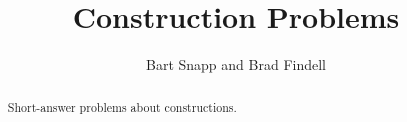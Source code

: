 \documentclass[nooutcomes]{ximera}
\title{Construction Problems}
\author{Bart Snapp and Brad Findell}
\begin{document}
\begin{abstract}
Short-answer problems about constructions. 
\end{abstract}
\maketitle


%
\end{document}

